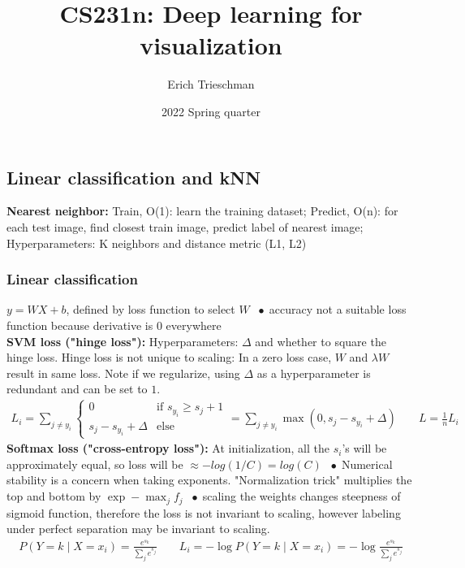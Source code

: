 \documentclass[9pt]{extarticle}
\title{CS231n: Deep learning for visualization}
\author{Erich Trieschman}
\date{2022 Spring quarter}
\newcommand*\bspace{$\; \bullet \;$}
\begin{document}


\subsection{Linear classification and kNN}
\textbf{Nearest neighbor:} Train, O(1): learn the training dataset; Predict, O(n): for each test image, find closest train image, predict label of nearest image; Hyperparameters: K neighbors and distance metric (L1, L2)
\subsubsection{Linear classification}
$y = WX + b$, defined by loss function to select $W$ \bspace accuracy not a suitable loss function because derivative is 0 everywhere\\
\textbf{SVM loss ("hinge loss"):} Hyperparameters: $\Delta$ and whether to square the hinge loss. Hinge loss is not unique to scaling: In a zero loss case, $W$ and $\lambda W$ result in same loss. Note if we regularize, using $\Delta$ as a hyperparameter is redundant and can be set to $1$.
\begin{align*}
    L_i  = \sum_{j \neq y_i} \begin{cases}
        0 & \textrm{if } s_{y_i} \geq s_j + 1 \\
        s_j - s_{y_i} + \Delta & \textrm{else}
    \end{cases} = \sum_{j \neq y_i} \max (0, s_j - s_{y_i} + \Delta) \;\;\;\;\;\;\; L = \frac{1}{n}L_i
\end{align*}
\textbf{Softmax loss ("cross-entropy loss"):} At initialization, all the $s_i$'s will be approximately equal, so loss will be $\approx -log(1/C) = log(C)$ \bspace Numerical stability is a concern when taking exponents. "Normalization trick" multiplies the top and bottom by $\exp -\max_j f_j$ \bspace scaling the weights changes steepness of sigmoid function, therefore the loss is not invariant to scaling, however labeling under perfect separation may be invariant to scaling.
\begin{align*}
    P(Y = k \mid X = x_i) = \frac{e^{s_k}}{\sum_j e^{s_j}} \;\;\;\;\;\;\; L_i = -\log P(Y = k \mid X = x_i) = -\log \frac{e^{s_k}}{\sum_j e^{s_j}}
\end{align*}
\end{document}
